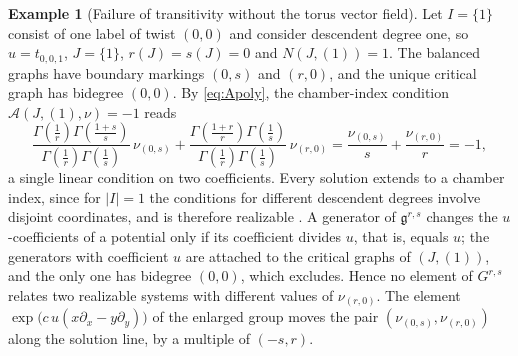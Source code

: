 \documentclass[11pt]{amsart}
\theoremstyle{definition}
\newtheorem{example}[theorem]{Example}
\theoremstyle{remark}
\newcommand{\gfrak}{\mathfrak{g}}
\begin{document}
\begin{example}[Failure of transitivity without the torus vector field]
\label{ex:failure}
Let $I=\{1\}$ consist of one label of twist $(0,0)$ and consider descendent
degree one, so $u=t_{0,0,1}$, $J=\{1\}$, $r(J)=s(J)=0$ and $N(J,(1))=1$.  The
balanced graphs have boundary markings $(0,s)$ and $(r,0)$, and the unique
critical graph has bidegree $(0,0)$.  By \eqref{eq:Apoly}, the chamber-index
condition $\mathcal A(J,(1),\nu)=-1$ reads
\[
 \frac{\Gamma(\frac1r)\Gamma(\frac{1+s}s)}{\Gamma(\frac1r)\Gamma(\frac1s)}\,
 \nu_{(0,s)}
 +\frac{\Gamma(\frac{1+r}r)\Gamma(\frac1s)}{\Gamma(\frac1r)\Gamma(\frac1s)}\,
 \nu_{(r,0)}
 =\frac{\nu_{(0,s)}}{s}+\frac{\nu_{(r,0)}}{r}=-1 ,
\]
a single linear condition on two coefficients.  Every solution extends to a
chamber index, since for $|I|=1$ the conditions for different descendent
degrees involve disjoint coordinates, and is therefore realizable
\cite[Corollary~5.14]{GKT}.  A generator of $\gfrak^{r,s}$ changes
the $u$-coefficients of a potential only if its coefficient divides $u$, that
is, equals $u$; the generators with coefficient $u$ are attached to the
critical graphs of $(J,(1))$, and the only one has bidegree $(0,0)$, which
\cite[Definition~4.23]{GKT} excludes.  Hence no element of $G^{r,s}$ relates
two realizable systems with different values of $\nu_{(r,0)}$.  The element
$\exp\bigl(c\,u(x\partial_x-y\partial_y)\bigr)$ of the enlarged group moves the
pair $(\nu_{(0,s)},\nu_{(r,0)})$ along the solution line, by a multiple of
$(-s,r)$.
\end{example}
\end{document}
